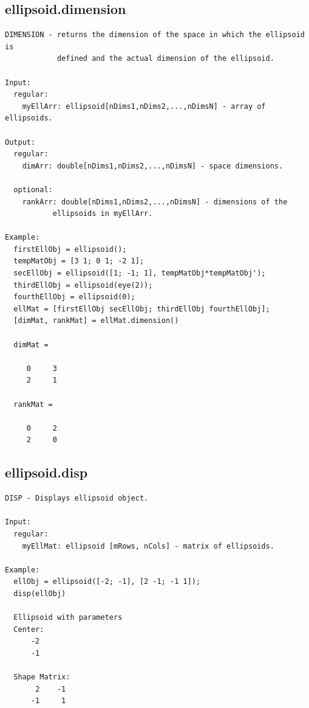 \documentclass[letterpaper,10pt,english]{sphinxmanual}
\begin{document}
\subsection{ellipsoid.dimension}
\label{chap_functions:ellipsoid-dimension}
\begin{Verbatim}[commandchars=\\\{\}]
DIMENSION - returns the dimension of the space in which the ellipsoid is
            defined and the actual dimension of the ellipsoid.

Input:
  regular:
    myEllArr: ellipsoid[nDims1,nDims2,...,nDimsN] - array of ellipsoids.

Output:
  regular:
    dimArr: double[nDims1,nDims2,...,nDimsN] - space dimensions.

  optional:
    rankArr: double[nDims1,nDims2,...,nDimsN] - dimensions of the
           ellipsoids in myEllArr.

Example:
  firstEllObj = ellipsoid();
  tempMatObj = [3 1; 0 1; -2 1];
  secEllObj = ellipsoid([1; -1; 1], tempMatObj*tempMatObj');
  thirdEllObj = ellipsoid(eye(2));
  fourthEllObj = ellipsoid(0);
  ellMat = [firstEllObj secEllObj; thirdEllObj fourthEllObj];
  [dimMat, rankMat] = ellMat.dimension()

  dimMat =

     0     3
     2     1

  rankMat =

     0     2
     2     0
\end{Verbatim}


\subsection{ellipsoid.disp}
\label{chap_functions:ellipsoid-disp}
\begin{Verbatim}[commandchars=\\\{\}]
DISP - Displays ellipsoid object.

Input:
  regular:
    myEllMat: ellipsoid [mRows, nCols] - matrix of ellipsoids.

Example:
  ellObj = ellipsoid([-2; -1], [2 -1; -1 1]);
  disp(ellObj)

  Ellipsoid with parameters
  Center:
      -2
      -1

  Shape Matrix:
       2    -1
      -1     1
\end{Verbatim}
\end{document}
